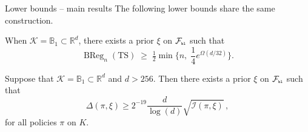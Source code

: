\documentclass{beamer}
\newcommand{\ball}{\mathbb{B}}
\newcommand{\BReg}{\operatorname{BReg}}
\newcommand{\R}{\mathbb{R}}
\newcommand{\cK}{\mathcal{K}}
\newcommand{\cF}{\mathcal{F}}
\newcommand{\cI}{\mathcal{I}}
\newcommand{\pb}{\text{\tiny\texttt{b}}}
\newcommand{\pl}{\text{\tiny\texttt{l}}}
\begin{document}
\begin{frame}{Lower bounds -- main results}
    \small
    The following lower bounds share the same construction.
    \begin{tcolorbox}[title=Lower Bound 4, colback=red!5, colframe=red!60!black]
        When $\cK = \ball_1 \subset \R^d$, there exists a prior $\xi$ on $\cF_{\pb\pl}$ such that
        \[
            \BReg_n(\text{TS}) \;\ge\; \tfrac12\min\!\bigl\{n,\;\frac{1}{4}e^{\Omega(d/32)}\bigr\}.
        \]
    \end{tcolorbox}
    \begin{tcolorbox}[title=Lower Bound 2, colback=red!5, colframe=red!60!black]
        Suppose that $\cK = \ball_1\subset \R^d$ and $d>256$.
        Then there exists a prior $\xi$ on $\cF_{\pb\pl}$ such that
        \[
            \Delta(\pi, \xi) \geq 2^{-19} \frac{d}{\log(d)} \sqrt{\cI(\pi, \xi)}\,,
        \]
        for all policies $\pi$ on $K$.
    \end{tcolorbox}
\end{frame}
\end{document}
